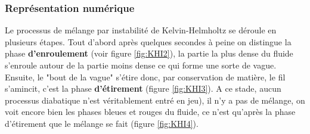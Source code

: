 \documentclass{rapportECC}
\begin{document}
\subsubsection{Représentation numérique}
Le processus de mélange par instabilité de Kelvin-Helmholtz se déroule en plusieurs étapes. Tout d'abord après quelques secondes à peine on distingue la phase \textbf{d'enroulement} (voir figure \ref{fig:KHI2}), la partie la plus dense du fluide s'enroule autour de la partie moins dense ce qui forme une sorte de vague. Ensuite, le "bout de la vague" s'étire donc, par conservation de matière, le fil s'amincit, c'est la phase \textbf{d'étirement} (figure \ref{fig:KHI3}). A ce stade, aucun processus diabatique n'est véritablement entré en jeu), il n'y a pas de mélange, on voit encore bien les phases bleues et rouges du fluide, ce n'est qu'après la phase d'étirement que le mélange se fait (figure \ref{fig:KHI4}).
\end{document}
